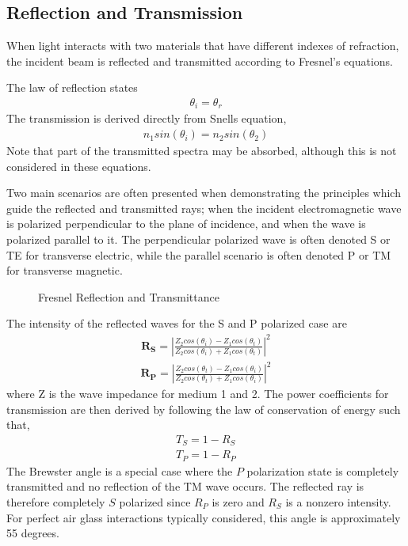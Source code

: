 \subsection{Reflection and Transmission}

When light interacts with two materials that have different indexes of refraction, the incident beam is reflected and transmitted according to Fresnel’s equations.

The law of reflection states
%
\begin{align}
    \theta_i = \theta_r
\end{align}
%
The transmission is derived directly from Snells equation,
%
\begin{align}
    n_1sin(\theta_i) = n_2sin(\theta_2)
\end{align}
%
Note that part of the transmitted spectra may be absorbed, although this is not considered in these equations.

Two main scenarios are often presented when demonstrating the principles which guide the reflected and transmitted rays; when the incident electromagnetic wave is polarized perpendicular to the plane of incidence, and when the wave is polarized parallel to it.  The perpendicular polarized wave is often denoted S or TE for transverse electric, while the parallel scenario is often denoted P or TM for transverse magnetic.

\begin{figure}[!htb]
    \begin{center}
    \end{center}
    \caption{Fresnel Reflection and Transmittance}
    \label{fig:polarization}
\end{figure}

The intensity of the reflected waves for the S and P polarized case are
%
\begin{align}
    \mathbf{R_S} = |\frac{Z_2cos(\theta_i)-Z_1cos(\theta_t)}{Z_2cos(\theta_i)+Z_1cos(\theta_t)}|^2
\end{align}
\begin{align}
    \mathbf{R_P} = |\frac{Z_2cos(\theta_t)-Z_1cos(\theta_i)}{Z_2cos(\theta_t)+Z_1cos(\theta_i)}|^2
\end{align}
%
where Z is the wave impedance for medium 1 and 2.  The power coefficients for transmission are then derived by following the law of conservation of energy such that,
%
\begin{align}
    T_S = 1 - R_S \\
    T_P = 1 - R_P
\end{align}
%
The Brewster angle is a special case where the $P$ polarization state is completely transmitted and no reflection of the TM wave occurs.  The reflected ray is therefore completely $S$ polarized since $R_P$ is zero and $R_S$ is a nonzero intensity.  For perfect air glass interactions typically considered, this angle is approximately 55 degrees.

